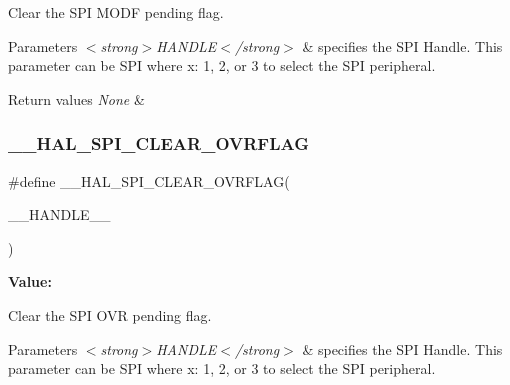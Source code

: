 Clear the S\+PI M\+O\+DF pending flag. 


\begin{DoxyParams}{Parameters}
{\em $<$strong$>$\+H\+A\+N\+D\+L\+E$<$/strong$>$} & specifies the S\+PI Handle. This parameter can be S\+PI where x\+: 1, 2, or 3 to select the S\+PI peripheral. \\
\hline
\end{DoxyParams}

\begin{DoxyRetVals}{Return values}
{\em None} & \\
\hline
\end{DoxyRetVals}
\mbox{\label{group___s_p_i___exported___macros_gaf6af33b1c5d334b9fe7bb778c5b6442e}} 
\subsubsection{\texorpdfstring{\_\_HAL\_SPI\_CLEAR\_OVRFLAG}{\_\_HAL\_SPI\_CLEAR\_OVRFLAG}}
{\footnotesize\ttfamily \#define \+\_\+\+\_\+\+H\+A\+L\+\_\+\+S\+P\+I\+\_\+\+C\+L\+E\+A\+R\+\_\+\+O\+V\+R\+F\+L\+AG(\begin{DoxyParamCaption}\item[{}]{\+\_\+\+\_\+\+H\+A\+N\+D\+L\+E\+\_\+\+\_\+ }\end{DoxyParamCaption})}

{\bfseries Value\+:}
\begin{DoxyCode}{0}
\DoxyCodeLine{\textcolor{keywordflow}{do}\{                                              \(\backslash\)}

\end{DoxyCode}


Clear the S\+PI O\+VR pending flag. 


\begin{DoxyParams}{Parameters}
{\em $<$strong$>$\+H\+A\+N\+D\+L\+E$<$/strong$>$} & specifies the S\+PI Handle. This parameter can be S\+PI where x\+: 1, 2, or 3 to select the S\+PI peripheral. \\
\hline
\end{DoxyParams}

